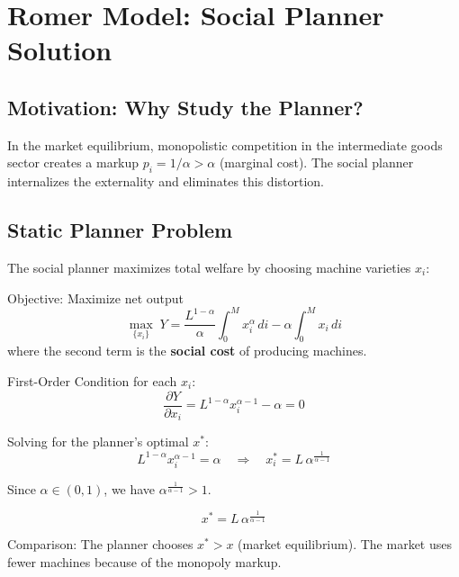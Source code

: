
\section{Romer Model: Social Planner Solution}

\subsection*{Motivation: Why Study the Planner?}
In the market equilibrium, monopolistic competition in the intermediate goods
sector creates a markup $p_i = 1/\alpha > \alpha$ (marginal cost). The social
planner internalizes the externality and eliminates this distortion.

\subsection{Static Planner Problem}

The social planner maximizes total welfare by choosing machine varieties $x_i$:

\begin{derivationbox}
Objective: Maximize net output
\[
\max_{\{x_i\}} \; Y = \frac{L^{1-\alpha}}{\alpha} \int_0^M x_i^\alpha \, di - \alpha \int_0^M x_i \, di
\]
where the second term is the \textbf{social cost} of producing machines.

\medskip
First-Order Condition for each $x_i$:
\[
\frac{\partial Y}{\partial x_i} = L^{1-\alpha} x_i^{\alpha-1} - \alpha = 0
\]

Solving for the planner's optimal $x^*$:
\[
L^{1-\alpha} x_i^{\alpha-1} = \alpha \quad \Rightarrow \quad
x_i^* = L \, \alpha^{\frac{1}{\alpha-1}}
\tag{Planner-x^*}
\]

Since $\alpha \in (0,1)$, we have $\alpha^{\frac{1}{\alpha-1}} > 1$.
\end{derivationbox}

\begin{resultbox}
\[
\boxed{x^* = L \, \alpha^{\frac{1}{\alpha-1}}}
\]

Comparison: The planner chooses $x^* > x$ (market equilibrium).
The market uses fewer machines because of the monopoly markup.
\end{resultbox}

